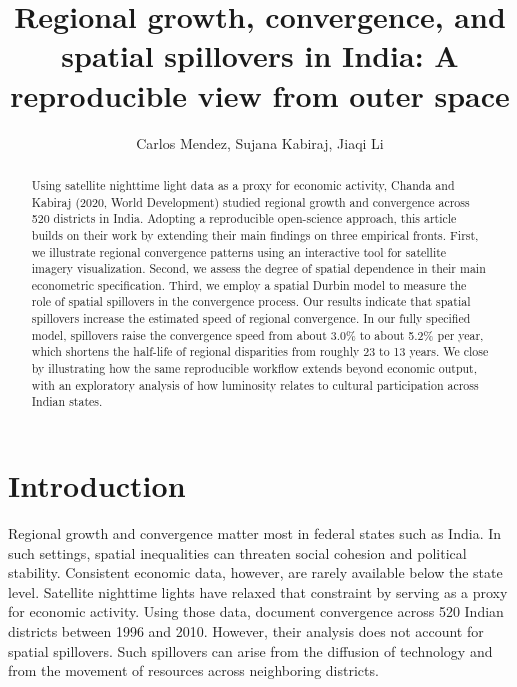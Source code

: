 \documentclass[
  a4paper, 
  twoside,
  final
]{article}
\title{Regional growth, convergence, and spatial spillovers in India: A
reproducible view from outer space}
\author{%
Carlos Mendez\parnote{Nagoya University, Nagoya, Japan}, 
Sujana Kabiraj\parnote{Shiv Nadar University, Greater Noida, India}, 
Jiaqi Li\parnote{Nagoya University, Nagoya, Japan}}
\date{}
\begin{document}
\maketitle
\begin{abstract}
Using satellite nighttime light data as a proxy for economic activity,
Chanda and Kabiraj (2020, World Development) studied regional growth and
convergence across 520 districts in India. Adopting a reproducible
open-science approach, this article builds on their work by extending
their main findings on three empirical fronts. First, we illustrate
regional convergence patterns using an interactive tool for satellite
imagery visualization. Second, we assess the degree of spatial
dependence in their main econometric specification. Third, we employ a
spatial Durbin model to measure the role of spatial spillovers in the
convergence process. Our results indicate that spatial spillovers
increase the estimated speed of regional convergence. In our fully
specified model, spillovers raise the convergence speed from about 3.0\%
to about 5.2\% per year, which shortens the half-life of regional
disparities from roughly 23 to 13 years. We close by illustrating how
the same reproducible workflow extends beyond economic output, with an
exploratory analysis of how luminosity relates to cultural participation
across Indian states.
\end{abstract}



\section{Introduction}\label{introduction}

Regional growth and convergence matter most in federal states such as
India. In such settings, spatial inequalities can threaten social
cohesion and political stability. Consistent economic data, however, are
rarely available below the state level. Satellite nighttime lights have
relaxed that constraint by serving as a proxy for economic activity.
Using those data, \citet{chanda_kabiraj_district_convergence} document
convergence across 520 Indian districts between 1996 and 2010. However,
their analysis does not account for spatial spillovers. Such spillovers
can arise from the diffusion of technology and from the movement of
resources across neighboring districts.
\end{document}
